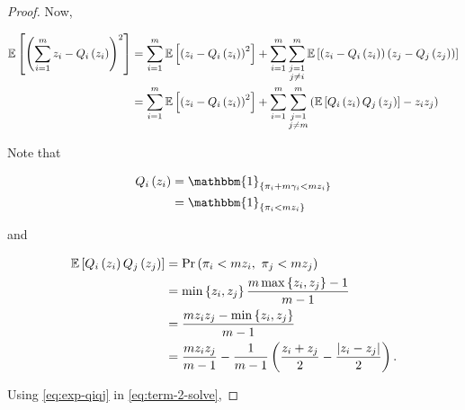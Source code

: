 \documentclass[twoside]{article}
\begin{document}
\begin{proof}
    Now,

    \begin{align}
        \mathbb{E}\left[ \left(\sum_{i=1}^mz_i-Q_i\left(z_i\right)\right)^2 \right] &= \sum_{i=1}^m\mathbb{E}\left[ \left(z_i-Q_i\left(z_i\right)\right)^2 \right] + \sum_{i=1}^{m}\sum_{\substack{j=1\\j\neq i}}^{m}\mathbb{E}\left[ \left(z_i-Q_i\left(z_i\right)\right)\left(z_j-Q_j\left(z_j\right)\right) \right] \\
                                                      &= \sum_{i=1}^m\mathbb{E}\left[ \left(z_i-Q_i\left(z_i\right)\right)^2 \right] + \sum_{i=1}^m\sum_{\substack{j=1\\j\neq m}}^m\left(\mathbb{E}\left[ Q_i\left(z_i\right)Q_j\left(z_j\right) \right]-z_iz_j\right)
                                                      \label{eq:term-2-solve}
    \end{align}

    Note that

    \begin{align}
        Q_i\brak{z_i} &= \mathbbm{1}_{\cbrak{\pi_i+m\gamma_i<mz_i}} \\
                      &= \mathbbm{1}_{\cbrak{\pi_i<mz_i}}
                      \label{eq:Qi-alt-def}
    \end{align}

    and

    \begin{align}
        \mean{Q_i\brak{z_i}Q_j\brak{z_j}} &= \pr{\pi_i<mz_i,\ \pi_j<mz_j} \\
                                          &= \min\cbrak{z_i,z_j}\frac{m\max\cbrak{z_i,z_j}-1}{m-1} \\
                                          &= \frac{mz_iz_j-\min\cbrak{z_i,z_j}}{m-1} \\
                                          &= \frac{mz_iz_j}{m-1} - \frac{1}{m-1}\brak{\frac{z_i+z_j}{2}-\frac{\abs{z_i-z_j}}{2}}.
                                          \label{eq:exp-qiqj}
    \end{align}

    Using \eqref{eq:exp-qiqj} in \eqref{eq:term-2-solve},


\end{proof}
\end{document}
